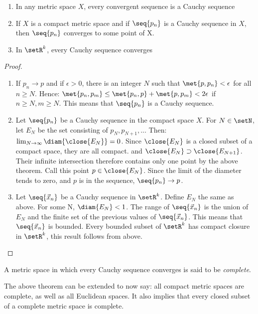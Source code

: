 \documentclass[12pt, letterpaper]{paper}
\begin{document}
\begin{theorem}
  \label{thr:3.11}
  \begin{enumerate}
  \item In any metric space $X$, every convergent sequence is a Cauchy
    sequence
  \item If $X$ is a compact metric space and if $\seq{p_n}$ is a
    Cauchy sequence in $X$, then $\seq{p_n}$ converges to some point
    of X.
  \item In $\setR^k$, every Cauchy sequence converges
  \end{enumerate}
\end{theorem}
\begin{proof}
  \begin{enumerate}
  \item If $p_n \to p$ and if $\epsilon > 0$, there is an integer $N$
    such that $\met{p,p_n} < \epsilon$ for all $n \geq N$.  Hence:
    $\met{p_n, p_m} \leq \met{ p_n, p} + \met{ p, p_m} < 2\epsilon$ if
    $n \geq N, m \geq N$. This means that $\seq{p_n}$ is a Cauchy
    sequence.
  \item Let $\seq{p_n}$ be a Cauchy sequence in the compact space $X$.
    For $N \in \setN$, let $E_N$ be the set consisting of
    $p_N, p_{N+1}, ...$ Then:
    $\lim_{N \to \infty} \diam{ \close{E_N}} = 0$. Since $\close{E_N}$
    is a closed subset of a compact space, they are all compact.  and
    $\close{E_N} \supset \close{E_{N+1}}$.  Their infinite
    intersection therefore contains only one point by the above
    theorem. Call this point $p \in \close{E_N}$. Since the limit of
    the diameter tends to zero, and $p$ is in the sequence,
    $\seq{p_n} \to p$.
  \item Let $\seq{\vec{x}_n}$ be a Cauchy sequence in
    $\setR^k$. Define $E_N$ the same as above. For some N,
    $\diam{E_N} < 1$. The range of $\seq{\vec{x}_n}$ is the union of
    $E_N$ and the finite set of the previous values of
    $\seq{\vec{x}_n}$. This means that $\seq{\vec{x}_n}$ is
    bounded. Every bounded subset of $\setR^k$ has compact closure in
    $\setR^k$, this result follows from above.
  \end{enumerate}
\end{proof}

A metric space in which every Cauchy sequence converges is said to be
\emph{complete}.

The above theorem can be extended to now say: all compact metric
spaces are complete, as well as all Euclidean spaces. It also implies
that every closed subset of a complete metric space is complete.
\end{document}
